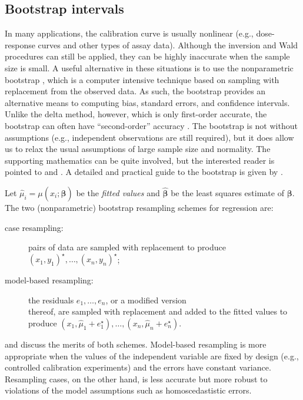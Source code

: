 \documentclass[cmfont,usenames,dvipsnames,leqno]{afit-etd}\usepackage[]{graphicx}\usepackage[]{color}
\newcommand{\boot}{\star} %
\newcommand{\wh}[1]{\ensuremath{\widehat{#1}}}
\begin{document}
\subsection{Bootstrap intervals}
\label{sec:boot_int}
In many applications, the calibration curve is usually nonlinear (e.g., dose-response curves and other types of assay data). Although the inversion and Wald procedures can still be applied, they can be highly inaccurate when the sample size is small. A useful alternative in these situations is to use the nonparametric bootstrap \citep{efron_bootstrap_1979}, which is a computer intensive technique based on sampling with replacement from the observed data. As such, the bootstrap provides an alternative means to computing bias, standard errors, and confidence intervals. Unlike the delta method, however, which is only first-order accurate, the bootstrap can often have ``second-order'' accuracy \citep[pg. 517]{casella_statistical_2002}. The bootstrap is not without assumptions (e.g., independent observations are still required), but it does allow us to relax the usual assumptions of large sample size and normality. The supporting mathematics can be quite involved, but the interested reader is pointed to \citet{efron_boot_1994} and \citet{hall_bootstrap_1992}. A detailed and practical guide to the bootstrap is given by \citet{davison_bootstrap_1997}. 

Let $\wh{\mu}_i = \mu\left(x_i; \wh{\bm{\beta}}\right)$ be the \textit{fitted values} and $\wh{\bm{\beta}}$ be the least squares estimate of $\bm{\beta}$. The two (nonparametric) bootstrap resampling schemes for regression are:
\begin{description}
  \item[case resampling:] pairs of data are sampled with replacement to produce \\ $\left(x_1, y_1\right)^\boot, \dotsc, \left(x_n, y_n\right)^\boot$;
  \item[model-based resampling:] the residuals $e_1, \dotsc, e_n$, or a modified version \\thereof, are sampled with replacement and added to the fitted values to produce $\left(x_1, \wh{\mu}_1+e_1^\boot\right), \dotsc, \left(x_n, \wh{\mu}_n+e_n^\boot\right)$.
\end{description}
\citet{efron_boot_1994} and \citet{davison_bootstrap_1997} discuss the merits of both schemes. Model-based resampling is more appropriate when the values of the independent variable are fixed by design (e.g., controlled calibration experiments) and the errors have constant variance. Resampling cases, on the other hand, is less accurate but more robust to violations of the model assumptions such as homoscedastistic errors. 
\end{document}
